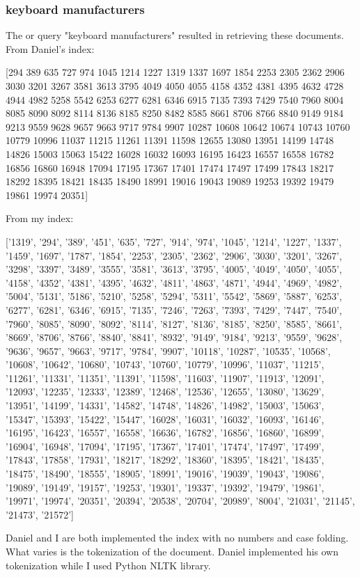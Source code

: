 \subsubsection{keyboard manufacturers}
\par The or query "keyboard manufacturers" resulted in retrieving these documents.
From Daniel's index:
\begin{center}
    [294 389 635 727 974 1045 1214 1227 1319 1337 1697 1854 2253 2305 2362 2906 3030 3201 3267 3581 3613 3795 4049 4050 4055 4158 4352 4381 4395 4632 4728 4944 4982 5258 5542 6253 6277 6281 6346 6915 7135 7393 7429 7540 7960 8004 8085 8090 8092 8114 8136 8185 8250 8482 8585 8661 8706 8766 8840 9149 9184 9213 9559 9628 9657 9663 9717 9784 9907 10287 10608 10642 10674 10743 10760 10779 10996 11037 11215 11261 11391 11598 12655 13080 13951 14199 14748 14826 15003 15063 15422 16028 16032 16093 16195 16423 16557 16558 16782 16856 16860 16948 17094 17195 17367 17401 17474 17497 17499 17843 18217 18292 18395 18421 18435 18490 18991 19016 19043 19089 19253 19392 19479 19861 19974 20351]
\end{center}
From my index:
\begin{center}
    ['1319', '294', '389', '451', '635', '727', '914', '974', '1045', '1214', '1227', '1337', '1459', '1697', '1787', '1854', '2253', '2305', '2362', '2906', '3030', '3201', '3267', '3298', '3397', '3489', '3555', '3581', '3613', '3795', '4005', '4049', '4050', '4055', '4158', '4352', '4381', '4395', '4632', '4811', '4863', '4871', '4944', '4969', '4982', '5004', '5131', '5186', '5210', '5258', '5294', '5311', '5542', '5869', '5887', '6253', '6277', '6281', '6346', '6915', '7135', '7246', '7263', '7393', '7429', '7447', '7540', '7960', '8085', '8090', '8092', '8114', '8127', '8136', '8185', '8250', '8585', '8661', '8669', '8706', '8766', '8840', '8841', '8932', '9149', '9184', '9213', '9559', '9628', '9636', '9657', '9663', '9717', '9784', '9907', '10118', '10287', '10535', '10568', '10608', '10642', '10680', '10743', '10760', '10779', '10996', '11037', '11215', '11261', '11331', '11351', '11391', '11598', '11603', '11907', '11913', '12091', '12093', '12235', '12333', '12389', '12468', '12536', '12655', '13080', '13629', '13951', '14199', '14331', '14582', '14748', '14826', '14982', '15003', '15063', '15347', '15393', '15422', '15447', '16028', '16031', '16032', '16093', '16146', '16195', '16423', '16557', '16558', '16636', '16782', '16856', '16860', '16899', '16904', '16948', '17094', '17195', '17367', '17401', '17474', '17497', '17499', '17843', '17858', '17931', '18217', '18292', '18360', '18395', '18421', '18435', '18475', '18490', '18555', '18905', '18991', '19016', '19039', '19043', '19086', '19089', '19149', '19157', '19253', '19301', '19337', '19392', '19479', '19861', '19971', '19974', '20351', '20394', '20538', '20704', '20989', '8004', '21031', '21145', '21473', '21572']
\end{center}
\par Daniel and I are both implemented the index with no numbers and case folding. What varies is the tokenization of the document. Daniel implemented his own tokenization while I used Python NLTK library.